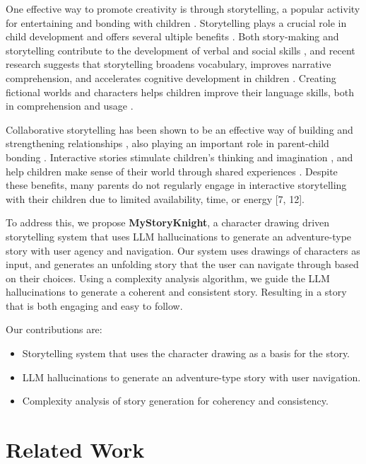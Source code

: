 \documentclass[submit,techrep,english]{ipsj}
\begin{document}
One effective way to promote creativity is through storytelling, a popular activity for entertaining and bonding with children \cite{7:SunLLL17}. Storytelling plays a crucial role in child development \cite{9:RyokaiC99} and offers several ultiple benefits \cite{7:SunLLL17}. Both story-making and storytelling contribute to the development of verbal and social skills \cite{1:ElgarfP22}, and recent research suggests that storytelling broadens vocabulary, improves narrative comprehension, and accelerates cognitive development in children \cite{7:SunLLL17}. Creating fictional worlds and characters helps children improve their language skills, both in comprehension and usage \cite{13:abs-2011-04242}.

Collaborative storytelling has been shown to be an effective way of building and strengthening relationships \cite{8:ShakeriND21}, also playing an important role in parent-child bonding \cite{12:ZhangXWYRWYWL22}. Interactive stories stimulate children's thinking and imagination \cite{11:LimaGV20}, and help children make sense of their world through shared experiences \cite{9:RyokaiC99}. Despite these benefits, many parents do not regularly engage in interactive storytelling with their children due to limited availability, time, or energy [7, 12].

To address this, we propose \textbf{MyStoryKnight}, a character drawing driven storytelling system that uses LLM hallucinations to generate an adventure-type story with user agency and navigation. Our system uses drawings of characters as input, and generates an unfolding story that the user can navigate through based on their choices. Using a complexity analysis algorithm, we guide the LLM hallucinations to generate a coherent and consistent story. Resulting in a story that is both engaging and easy to follow.

Our contributions are:
\begin{itemize}
    \item Storytelling system that uses the character drawing as a basis for the story.
    \item LLM hallucinations to generate an adventure-type story with user navigation.
    \item Complexity analysis of story generation for coherency and consistency.
\end{itemize}


\section{Related Work}
\label{sec:related-work}
\end{document}
